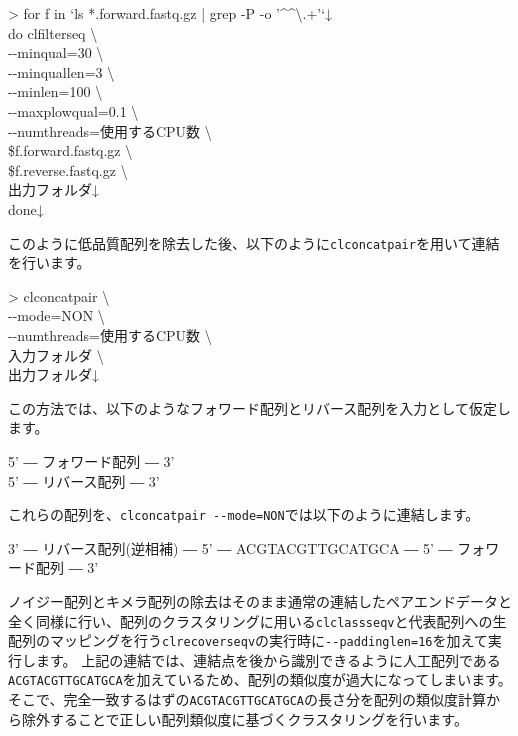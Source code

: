\documentclass[titlepage,10pt,a4paper]{jsbook}
\newenvironment{pre}{\begin{leftbar}\raggedright\ttfamily\footnotesize\setlength{\baselineskip}{1.4em}}{\end{leftbar}\vspace{-1em}}
\newenvironment{cmd}{\begin{oframed}\raggedright\ttfamily\footnotesize\setlength{\baselineskip}{1.4em}}{\end{oframed}\vspace{-1em}}
\begin{document}
\begin{cmd}
{\textgreater} for f in `ls *.forward.fastq.gz | grep -P -o '{\textasciicircum}{\lbrack}{\textasciicircum}{\textbackslash}.{\rbrack}+'`↓\\
do clfilterseq {\textbackslash}\\
{-}{-}minqual=30 {\textbackslash}\\
{-}{-}minquallen=3 {\textbackslash}\\
{-}{-}minlen=100 {\textbackslash}\\
{-}{-}maxplowqual=0.1 {\textbackslash}\\
{-}{-}numthreads=使用するCPU数 {\textbackslash}\\
\$f.forward.fastq.gz {\textbackslash}\\
\$f.reverse.fastq.gz {\textbackslash}\\
出力フォルダ↓\\
done↓
\end{cmd}

このように低品質配列を除去した後、以下のように\texttt{clconcatpair}を用いて連結を行います。

\begin{cmd}
{\textgreater} clconcatpair {\textbackslash}\\
{-}{-}mode=NON {\textbackslash}\\
{-}{-}numthreads=使用するCPU数 {\textbackslash}\\
入力フォルダ {\textbackslash}\\
出力フォルダ↓
\end{cmd}

この方法では、以下のようなフォワード配列とリバース配列を入力として仮定します。

\begin{pre}
5' ― フォワード配列 ― 3'\\
5' ― リバース配列 ― 3'
\end{pre}

これらの配列を、\texttt{clconcatpair {-}{-}mode=NON}では以下のように連結します。

\begin{pre}
3' ― リバース配列(逆相補) ― 5' ― ACGTACGTTGCATGCA ― 5' ― フォワード配列 ― 3'
\end{pre}

ノイジー配列とキメラ配列の除去はそのまま通常の連結したペアエンドデータと全く同様に行い、配列のクラスタリングに用いる\texttt{clclassseqv}と代表配列への生配列のマッピングを行う\texttt{clrecoverseqv}の実行時に\texttt{{-}{-}paddinglen=16}を加えて実行します。
上記の連結では、連結点を後から識別できるように人工配列である\texttt{ACGTACGTTGCATGCA}を加えているため、配列の類似度が過大になってしまいます。
そこで、完全一致するはずの\texttt{ACGTACGTTGCATGCA}の長さ分を配列の類似度計算から除外することで正しい配列類似度に基づくクラスタリングを行います。
\end{document}
